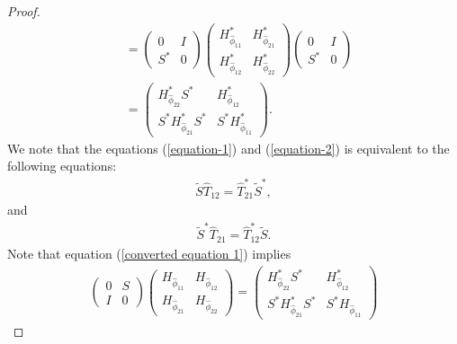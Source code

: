 \documentclass[12pt, reqno]{amsart}
\theoremstyle{definition}
\theoremstyle{remark}
\numberwithin{equation}{section}
\begin{document}
\begin{proof}
\begin{align*}
                &=\begin{pmatrix}
                0&I\\
                S^*&0
            \end{pmatrix}
            \begin{pmatrix}
                H^*_{\hat{\phi}_{11}}&H^*_{\hat{\phi}_{21}}\\
                H^*_{\hat{\phi}_{12}}&H^*_{\hat{\phi}_{22}}
                \end{pmatrix}
            \begin{pmatrix}
                0&I\\
                S^*&0
            \end{pmatrix}\\
            &=\begin{pmatrix}
                H^*_{\hat{\phi}_{22}}S^*&H^*_{\hat{\phi}_{12}}\\
                S^*H^*_{\hat{\phi}_{21}}S^*&S^*H^*_{\hat{\phi}_{11}}
            \end{pmatrix}.
            \end{align*}
            We note that the equations (\ref{equation-1}) and (\ref{equation-2}) is equivalent to the following equations:
            \begin{align}\label{converted equation 1}
                \tilde S \hat T_{12}=\hat T^*_{21}{\tilde S}^*,
            \end{align}
            and
            \begin{align}\label{converted equation 2}
                 {\tilde S}^* \hat T_{21}=\hat T^*_{12}\tilde S.
            \end{align}
            Note that equation (\ref{converted equation 1}) implies
            \begin{align*}
                \begin{pmatrix}
                0&S\\
                I&0
            \end{pmatrix}
            \begin{pmatrix}
                H_{\hat{\phi}_{11}}&H_{\hat{\phi}_{12}}\\
                H_{\hat{\phi}_{21}}&H_{\hat{\phi}_{22}}
                \end{pmatrix}
                =\begin{pmatrix}
                H^*_{\hat{\phi}_{22}}S^*&H^*_{\hat{\phi}_{12}}\\
                S^*H^*_{\hat{\phi}_{21}}S^*&S^*H_{\hat{\phi}_{11}}

\end{pmatrix}
\end{align*}
\end{proof}
\end{document}
